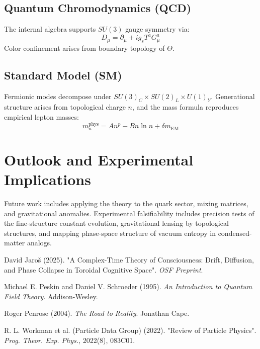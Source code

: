 \documentclass[12pt, a4paper]{article}
\begin{document}
\subsection{Quantum Chromodynamics (QCD)}
The internal algebra supports \( SU(3) \) gauge symmetry via:
\[
D_\mu = \partial_\mu + i g_s T^a G_\mu^a
\]
Color confinement arises from boundary topology of \( \Theta \).

\subsection{Standard Model (SM)}
Fermionic modes decompose under \( SU(3)_C \times SU(2)_L \times U(1)_Y \). Generational structure arises from topological charge \( n \), and the mass formula reproduces empirical lepton masses:
\[
m_n^{\text{phys}} = A n^p - B n \ln n + \delta m_{\text{EM}}
\]

\section{Outlook and Experimental Implications}
Future work includes applying the theory to the quark sector, mixing matrices, and gravitational anomalies. Experimental falsifiability includes precision tests of the fine-structure constant evolution, gravitational lensing by topological structures, and mapping phase-space structure of vacuum entropy in condensed-matter analogs.

\begin{thebibliography}{9}

David Jaroš (2025). "A Complex-Time Theory of Consciousness: Drift, Diffusion, and Phase Collapse in Toroidal Cognitive Space". \textit{OSF Preprint}.

Michael E. Peskin and Daniel V. Schroeder (1995). \textit{An Introduction to Quantum Field Theory}. Addison-Wesley.

Roger Penrose (2004). \textit{The Road to Reality}. Jonathan Cape.

R. L. Workman et al. (Particle Data Group) (2022). "Review of Particle Physics". \textit{Prog. Theor. Exp. Phys.}, 2022(8), 083C01.

\end{thebibliography}
\end{document}
